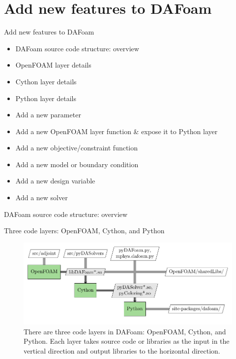 \documentclass{bredelebeamer}
\begin{document}
\section{Add new features to DAFoam}
\renewcommand{\arraystretch}{2}

\begin{frame}{}
  \center \Large Add new features to DAFoam
  \normalsize
  \begin{itemize}
    \setlength\itemsep{1em}
    \item DAFoam source code structure: overview
    \item OpenFOAM layer details
    \item Cython layer details
    \item Python layer details
    \item Add a new parameter
    \item Add a new OpenFOAM layer function \& expose it to Python layer
    \item Add a new objective/constraint function
    \item Add a new model or boundary condition
    \item Add a new design variable
    \item Add a new solver
  \end{itemize}
\end{frame}

\begin{frame}{}
  \center \Large DAFoam source code structure: overview
\end{frame}

\begin{frame}{Three code layers: OpenFOAM, Cython, and Python}
\begin{figure}
\includegraphics[width=1.05\linewidth]{images/dafoam_layers.pdf} 
\caption{There are three code layers in DAFoam: OpenFOAM, Cython, and Python. Each layer takes source code or libraries as the input in the vertical direction and output libraries to the horizontal direction.}
\end{figure}
\end{frame}
\end{document}
